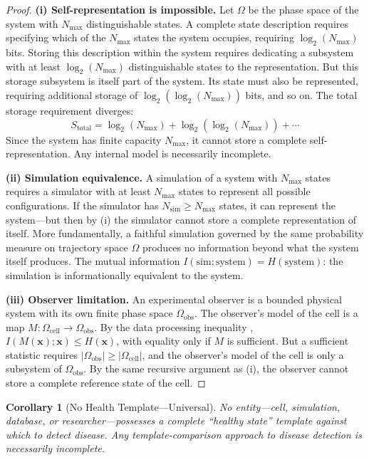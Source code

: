 \documentclass[10pt,twocolumn,a4paper]{article}
\theoremstyle{plain}
\newtheorem{corollary}[theorem]{Corollary}
\theoremstyle{definition}
\theoremstyle{remark}
\begin{document}
\begin{proof}
\textbf{(i) Self-representation is impossible.} Let $\Omega$ be the phase space of the system with $N_{\max}$ distinguishable states. A complete state description requires specifying which of the $N_{\max}$ states the system occupies, requiring $\log_2(N_{\max})$ bits. Storing this description within the system requires dedicating a subsystem with at least $\log_2(N_{\max})$ distinguishable states to the representation. But this storage subsystem is itself part of the system. Its state must also be represented, requiring additional storage of $\log_2(\log_2(N_{\max}))$ bits, and so on. The total storage requirement diverges:
\begin{equation}
    S_{\mathrm{total}} = \log_2(N_{\max}) + \log_2(\log_2(N_{\max})) + \cdots
\end{equation}
Since the system has finite capacity $N_{\max}$, it cannot store a complete self-representation. Any internal model is necessarily incomplete.

\textbf{(ii) Simulation equivalence.} A simulation of a system with $N_{\max}$ states requires a simulator with at least $N_{\max}$ states to represent all possible configurations. If the simulator has $N_{\mathrm{sim}} \geq N_{\max}$ states, it can represent the system---but then by (i) the simulator cannot store a complete representation of itself. More fundamentally, a faithful simulation governed by the same probability measure on trajectory space $\Omega$ produces no information beyond what the system itself produces. The mutual information $I(\text{sim}; \text{system}) = H(\text{system})$: the simulation is informationally equivalent to the system.

\textbf{(iii) Observer limitation.} An experimental observer is a bounded physical system with its own finite phase space $\Omega_{\mathrm{obs}}$. The observer's model of the cell is a map $M: \Omega_{\mathrm{cell}} \to \Omega_{\mathrm{obs}}$. By the data processing inequality \citep{cover2006}, $I(M(\mathbf{x}); \mathbf{x}) \leq H(\mathbf{x})$, with equality only if $M$ is sufficient. But a sufficient statistic requires $|\Omega_{\mathrm{obs}}| \geq |\Omega_{\mathrm{cell}}|$, and the observer's model of the cell is only a subsystem of $\Omega_{\mathrm{obs}}$. By the same recursive argument as (i), the observer cannot store a complete reference state of the cell.
\end{proof}

\begin{corollary}[No Health Template---Universal]
\label{cor:no_health}
No entity---cell, simulation, database, or researcher---possesses a complete ``healthy state'' template against which to detect disease. Any template-comparison approach to disease detection is necessarily incomplete.
\end{corollary}
\end{document}
